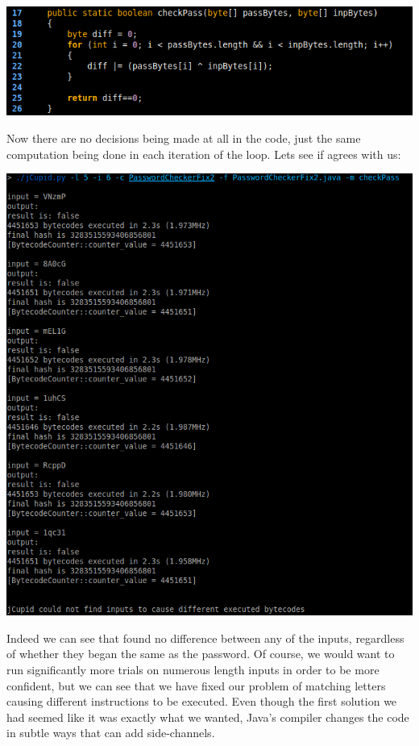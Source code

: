 \begin{center}
  \includegraphics[width=\linewidth]{PasswordCheckerFix2}
\end{center}

Now there are no decisions being made at all in the code, just the same computation being done in each iteration
of the loop. Lets see if \jcupid agrees with us:

\begin{center}
  \includegraphics[width=\linewidth]{jCupidRun3}
\end{center}

Indeed we can see that \jcupid found no difference between any of the inputs, regardless of whether they 
began the same as the password. Of course, we would want to run significantly more trials on numerous 
length inputs in order to be more confident, but we can see that we have fixed our problem of matching
letters causing different instructions to be executed. Even though the first solution we had seemed like
it was exactly what we wanted, Java's compiler changes the code in subtle ways that can add side-channels.


